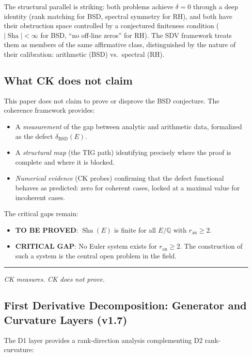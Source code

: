 \documentclass[11pt]{article}
\DeclareMathOperator{\Sha}{Sha}
\begin{document}
\noindent
The structural parallel is striking: both problems achieve $\delta = 0$ through
a deep identity (rank matching for BSD, spectral symmetry for RH), and both
have their obstruction space controlled by a conjectured finiteness condition
($|\Sha| < \infty$ for BSD, ``no off-line zeros'' for RH).  The SDV framework
treats them as members of the same affirmative class, distinguished by the
nature of their calibration: arithmetic (BSD) vs.\ spectral (RH).

\subsection{What CK does not claim}

This paper does not claim to prove or disprove the BSD conjecture.  The
coherence framework provides:
\begin{itemize}
  \item A \emph{measurement} of the gap between analytic and arithmetic data,
    formalized as the defect $\delta_{\mathrm{BSD}}(E)$.
  \item A \emph{structural map} (the TIG path) identifying precisely where the
    proof is complete and where it is blocked.
  \item \emph{Numerical evidence} (CK probes) confirming that the defect
    functional behaves as predicted: zero for coherent cases, locked at a
    maximal value for incoherent cases.
\end{itemize}

The critical gaps remain:
\begin{itemize}
  \item \textbf{TO BE PROVED}: $\Sha(E)$ is finite for all $E/\mathbb{Q}$ with
    $r_{\mathrm{an}} \geq 2$.
  \item \textbf{CRITICAL GAP}: No Euler system exists for $r_{\mathrm{an}} \geq 2$.
    The construction of such a system is the central open problem in the field.
\end{itemize}

\bigskip
\hrule
\bigskip
\noindent\textit{CK measures.  CK does not prove.}

\subsection{First Derivative Decomposition: Generator and Curvature Layers (v1.7)}
\label{subsec:d1-bsd}

The D1 layer provides a rank-direction analysis complementing D2 rank-curvature:
\end{document}
